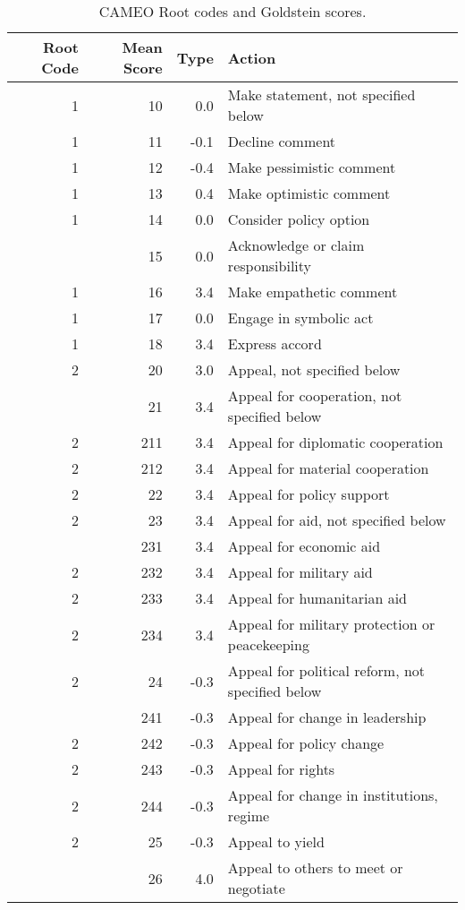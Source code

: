\documentclass[10pt,]{article}
\begin{document}
\begin{longtable}[t]{rrrl}
\caption{\label{tab:CameoCodes}\label{tab:CAMEOcodes}CAMEO Root codes and Goldstein scores.}\\
\toprule
Root Code & Mean Score & Type & Action\\
\midrule
1 & 10 & 0.0 & Make statement, not specified below\\
1 & 11 & -0.1 & Decline comment\\
1 & 12 & -0.4 & Make pessimistic comment\\
1 & 13 & 0.4 & Make optimistic comment\\
1 & 14 & 0.0 & Consider policy option\\
\addlinespace
1 & 15 & 0.0 & Acknowledge or claim responsibility\\
1 & 16 & 3.4 & Make empathetic comment\\
1 & 17 & 0.0 & Engage in symbolic act\\
1 & 18 & 3.4 & Express accord\\
2 & 20 & 3.0 & Appeal, not specified below\\
\addlinespace
2 & 21 & 3.4 & Appeal for cooperation, not specified below\\
2 & 211 & 3.4 & Appeal for diplomatic cooperation\\
2 & 212 & 3.4 & Appeal for material cooperation\\
2 & 22 & 3.4 & Appeal for policy support\\
2 & 23 & 3.4 & Appeal for aid, not specified below\\
\addlinespace
2 & 231 & 3.4 & Appeal for economic aid\\
2 & 232 & 3.4 & Appeal for military aid\\
2 & 233 & 3.4 & Appeal for humanitarian aid\\
2 & 234 & 3.4 & Appeal for military protection or peacekeeping\\
2 & 24 & -0.3 & Appeal for political reform, not specified below\\
\addlinespace
2 & 241 & -0.3 & Appeal for change in leadership\\
2 & 242 & -0.3 & Appeal for policy change\\
2 & 243 & -0.3 & Appeal for rights\\
2 & 244 & -0.3 & Appeal for change in institutions, regime\\
2 & 25 & -0.3 & Appeal to yield\\
\addlinespace
2 & 26 & 4.0 & Appeal to others to meet or negotiate\\

\end{longtable}
\end{document}
